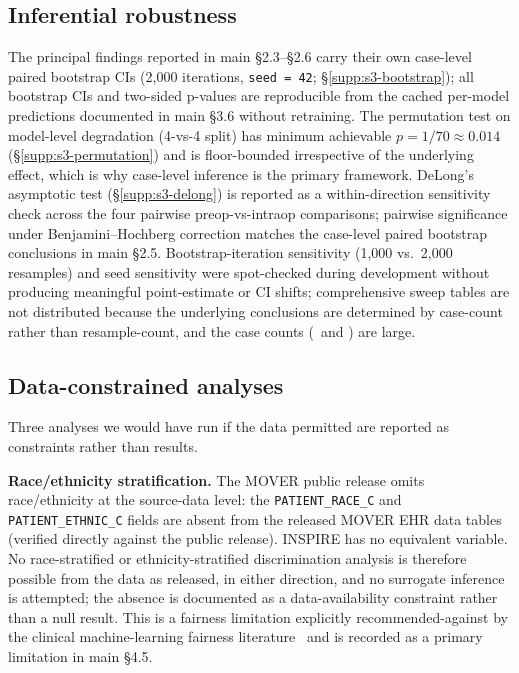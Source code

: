 \documentclass[11pt,a4paper]{article}
\begin{document}
\subsection{Inferential robustness}\label{supp:s5-inferential-robustness}

The principal findings reported in main \S2.3--\S2.6 carry their own
case-level paired bootstrap CIs (2{,}000 iterations,
\texttt{seed = 42}; \S\ref{supp:s3-bootstrap}); all bootstrap CIs and
two-sided p-values are reproducible from the cached per-model
predictions documented in main \S3.6 without retraining. The
permutation test on model-level degradation (4-vs-4 split) has minimum
achievable $p = 1/70 \approx 0.014$ (\S\ref{supp:s3-permutation}) and is
floor-bounded irrespective of the underlying effect, which is why
case-level inference is the primary framework. DeLong's asymptotic test
(\S\ref{supp:s3-delong}) is reported as a within-direction sensitivity
check across the four pairwise preop-vs-intraop comparisons; pairwise
significance under Benjamini--Hochberg correction matches the
case-level paired bootstrap conclusions in main \S2.5. Bootstrap-iteration
sensitivity (1{,}000 vs.\ 2{,}000 resamples) and seed sensitivity were
spot-checked during development without producing meaningful
point-estimate or CI shifts; comprehensive sweep tables are not
distributed because the underlying conclusions are determined by
case-count rather than resample-count, and the case counts
(\pnTableOneNInspire\ and \pnTableOneNMover) are large.

\subsection{Data-constrained analyses}\label{supp:s5-data-constrained}

Three analyses we would have run if the data permitted are reported as
constraints rather than results.

\textbf{Race/ethnicity stratification.} The MOVER public release omits
race/ethnicity at the source-data level: the
\texttt{PATIENT\_RACE\_C} and \texttt{PATIENT\_ETHNIC\_C} fields are
absent from the released MOVER EHR data tables (verified directly
against the public release). INSPIRE has no equivalent variable. No race-stratified or ethnicity-stratified discrimination analysis
is therefore possible from the data as released, in either direction, and
no surrogate inference is attempted; the absence is documented as a
data-availability constraint rather than a null result. This is a fairness limitation explicitly recommended-against by
the clinical machine-learning fairness literature~\cite{Chen2020,Pfohl2021}
and is recorded as a primary limitation in main \S4.5.
\end{document}
